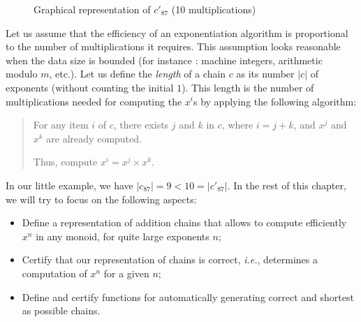 \begin{figure}[h]
  \centering
  
  \caption{Graphical representation of $c'_{87}$ (10 multiplications)}
  \label{fig:chain-87-bin}
\end{figure}



Let us assume that the efficiency of an exponentiation algorithm is proportional
to the number of multiplications it requires. This assumption looks reasonable 
when the data size is bounded (for instance : machine integers, arithmetic modulo $m$, etc.). 
Let us define the \emph{length} of a chain $c$ as its number $|c|$ of exponents
(without counting the initial $1$). 
This length is the number of multiplications needed for 
computing the $x^i$s by applying the following algorithm:

\begin{quote}
For any item $i$ of $c$, there exists $j$ and $k$ in $c$, where
$i=j+k$, and $x^j$ and $x^k$ are already computed.

Thus, compute $x^i = x^j \times x^k$.
\end{quote}

In our little example, we have 
$|c_{87}| = 9 < 10 = |c'_{87}|$. 
In the rest of this chapter, we will try to focus on the following aspects:
\begin{itemize}
\item Define a representation of addition chains that allows to compute
  efficiently $x^n$ in any monoid, for quite large exponents $n$;
\item Certify that our representation of chains is correct, 
    \emph{i.e.}, determines a computation of $x^n$ for a given $n$;
\item Define and certify functions for automatically  generating 
    correct and shortest as possible chains.
\end{itemize}

